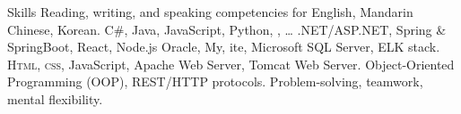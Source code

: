 
\begin{rubric}{Skills}
\entry*[Languages]
	Reading, writing, and speaking competencies for English, Mandarin Chinese, Korean.
	C\#, Java, JavaScript, Python, , \ldots
{}
	.NET/ASP.NET, Spring \& SpringBoot, React, Node.js
\entry*[Databases]
	Oracle, My, ite, Microsoft SQL Server, ELK stack.
	\textsc{Html, css}, JavaScript, Apache Web Server, Tomcat Web Server.
	Object-Oriented Programming (OOP), REST/HTTP protocols.
	Problem-solving, teamwork, mental flexibility.
\end{rubric}
